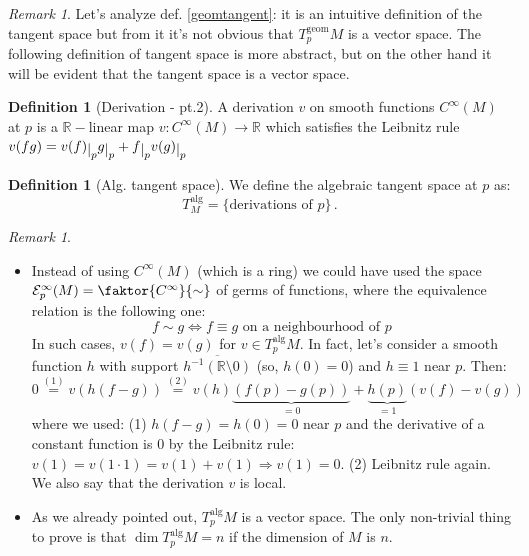 \documentclass[a4paper,11pt,titlepage, article, oneside]{memoir}
\numberwithin{equation}{section}
\theoremstyle{definition}
\newtheorem{definition}[theorem]{Definition}
\theoremstyle{remark}
\newtheorem{remark}[theorem]{Remark}
\newcommand{\rfield}{\mathbb{R}}
\newcommand{\restrict}[2]{{#1}\raisebox{-.5ex}{$|$}_{#2}}
\newcommand{\tangentgeom}[1]{T_{#1}^{\text{geom}}}
\newcommand{\tangentalg}[1]{T_{#1}^{\text{alg}}}
\begin{document}
\begin{remarkbox}\begin{remark}
Let's analyze def. \ref{geomtangent}: it is an intuitive definition of the tangent space but from it it's not obvious that $\tangentgeom{p} M$ is a vector space. The following definition of tangent space is more abstract, but on the other hand it will be evident that the tangent space is a vector space.
\end{remark}\end{remarkbox}

\begin{definition}[Derivation - pt.2]
A derivation $v$ on smooth functions $C^{\infty}(M)$ at $p$ is a $\rfield-$linear map $v \colon C^{\infty}(M) \rightarrow \rfield$ which satisfies the Leibnitz rule $v(fg) = \restrict{v(f)}{p} \restrict{g}{p} + \restrict{f}{p}\restrict{v(g)}{p}$
\end{definition}

\begin{definition}[Alg. tangent space]
We define the algebraic tangent space at $p$ as:
\begin{equation*}
\tangentalg M = \{\text{derivations of } p \} \, .
\end{equation*}
\end{definition}

\begin{remarkbox}\begin{remark}
$ $
\begin{itemize}
\item Instead of using $C^{\infty}(M)$ (which is a ring) we could have used the space $\mathcal{E}^{\infty}_p (M) = \faktor{C^{\infty}}{\sim}$ of germs of functions, where the equivalence relation is the following one:
$$f \sim g \Leftrightarrow f \equiv g \text{ on a neighbourhood of } p$$
In such cases, $v(f) = v(g)$ for $v \in \tangentalg{p} M$. In fact, let's consider a smooth function $h$ with support $\overline{h^{-1}(\rfield \setminus {0})}$ (so, $h(0) = 0$) and $h \equiv 1$ near $p$. Then:
$$0 \overset{(1)} {=} v\left(h(f-g)\right) \overset{(2)}{=} v(h)\underbrace{\left(f(p) - g(p)\right)}_{=0} + \underbrace{h(p)}_{=1}\left (v(f) - v(g) \right)$$
where we used: (1) $h(f-g) = h(0) = 0$ near $p$ and the derivative of a constant function is 0 by the Leibnitz rule: $v(1) = v(1\cdot 1) = v(1)+v(1) \Rightarrow v(1)=0$. (2) Leibnitz rule again.
We also say that the derivation $v$ is local.
\item As we already pointed out, $\tangentalg{p} M$ is a vector space. The only non-trivial thing to prove is that $\dim \tangentalg {p}M = n$ if the dimension of $M$ is $n$. 
\end{itemize}
\end{remark}\end{remarkbox}
\end{document}
